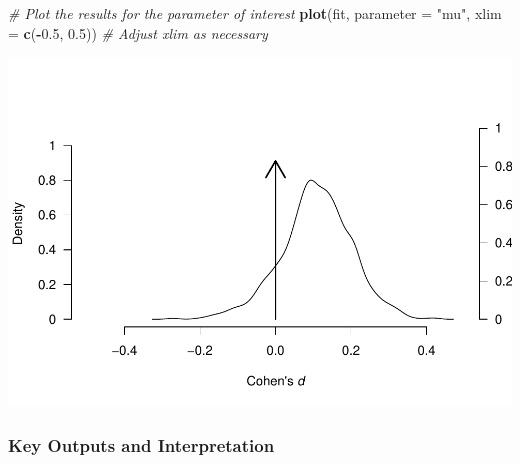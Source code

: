 \documentclass[
]{book}
\newenvironment{Shaded}{\begin{snugshade}}{\end{snugshade}}
\newcommand{\AttributeTok}[1]{\textcolor[rgb]{0.13,0.29,0.53}{#1}}
\newcommand{\CommentTok}[1]{\textcolor[rgb]{0.56,0.35,0.01}{\textit{#1}}}
\newcommand{\FloatTok}[1]{\textcolor[rgb]{0.00,0.00,0.81}{#1}}
\newcommand{\FunctionTok}[1]{\textcolor[rgb]{0.13,0.29,0.53}{\textbf{#1}}}
\newcommand{\NormalTok}[1]{#1}
\newcommand{\SpecialCharTok}[1]{\textcolor[rgb]{0.81,0.36,0.00}{\textbf{#1}}}
\newcommand{\StringTok}[1]{\textcolor[rgb]{0.31,0.60,0.02}{#1}}
\begin{document}
\begin{Shaded}
\begin{Highlighting}[]
\CommentTok{\# Plot the results for the parameter of interest}
\FunctionTok{plot}\NormalTok{(fit, }\AttributeTok{parameter =} \StringTok{"mu"}\NormalTok{, }\AttributeTok{xlim =} \FunctionTok{c}\NormalTok{(}\SpecialCharTok{{-}}\FloatTok{0.5}\NormalTok{, }\FloatTok{0.5}\NormalTok{))  }\CommentTok{\# Adjust xlim as necessary}
\end{Highlighting}
\end{Shaded}

\includegraphics{_main_files/figure-latex/unnamed-chunk-37-1.pdf}

\subsubsection{Key Outputs and Interpretation}\label{key-outputs-and-interpretation}
\end{document}
